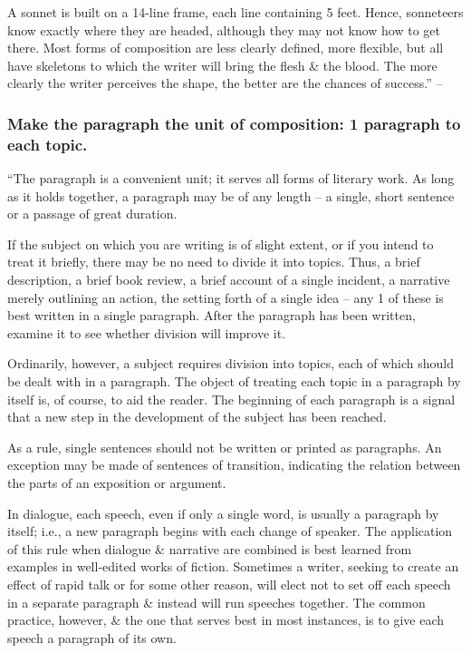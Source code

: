\documentclass{article}
\begin{document}
A sonnet is built on a 14-line frame, each line containing 5 feet. Hence, sonneteers know exactly where they are headed, although they may not know how to get there. Most forms of composition are less clearly defined, more flexible, but all have skeletons to which the writer will bring the flesh \& the blood. The more clearly the writer perceives the shape, the better are the chances of success.'' -- \cite[p. 29]{Strunk_White_element_style}


\subsubsection{Make the paragraph the unit of composition: 1 paragraph to each topic.}
``The paragraph is a convenient unit; it serves all forms of literary work. As long as it holds together, a paragraph may be of any length -- a single, short sentence or a passage of great duration.

If the subject on which you are writing is of slight extent, or if you intend to treat it briefly, there may be no need to divide it into topics. Thus, a brief description, a brief book review, a brief account of a single incident, a narrative merely outlining an action, the setting forth of a single idea -- any 1 of these is best written in a single paragraph. After the paragraph has been written, examine it to see whether division will improve it.

Ordinarily, however, a subject requires division into topics, each of which should be dealt with in a paragraph. The object of treating each topic in a paragraph by itself is, of course, to aid the reader. The beginning of each paragraph is a signal that a new step in the development of the subject has been reached.

As a rule, single sentences should not be written or printed as paragraphs. An exception may be made of sentences of transition, indicating the relation between the parts of an exposition or argument.

In dialogue, each speech, even if only a single word, is usually a paragraph by itself; i.e., a new paragraph begins with each change of speaker. The application of this rule when dialogue \& narrative are combined is best learned from examples in well-edited works of fiction. Sometimes a writer, seeking to create an effect of rapid talk or for some other reason, will elect not to set off each speech in a separate paragraph \& instead will run speeches together. The common practice, however, \& the one that serves best in most instances, is to give each speech a paragraph of its own.
\end{document}
